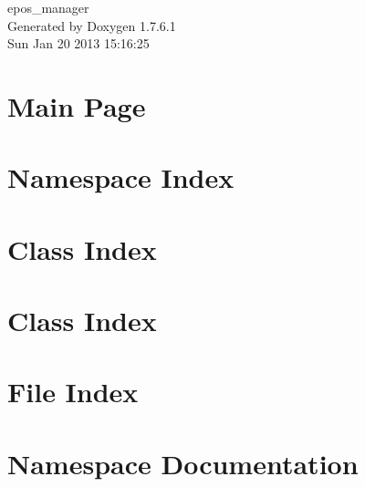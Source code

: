 \documentclass[a4paper]{book}
\begin{document}
\begin{titlepage}
\vspace*{7cm}
\begin{center}
{\Large epos\-\_\-manager }\\
\vspace*{1cm}
{\large \-Generated by Doxygen 1.7.6.1}\\
\vspace*{0.5cm}
{\small Sun Jan 20 2013 15:16:25}\\
\end{center}
\end{titlepage}
\clearemptydoublepage
{}
\tableofcontents
\clearemptydoublepage
{}
\chapter{\-Main \-Page}
\label{index}
\chapter{\-Namespace \-Index}

\chapter{\-Class \-Index}

\chapter{\-Class \-Index}

\chapter{\-File \-Index}

\chapter{\-Namespace \-Documentation}













\end{document}
